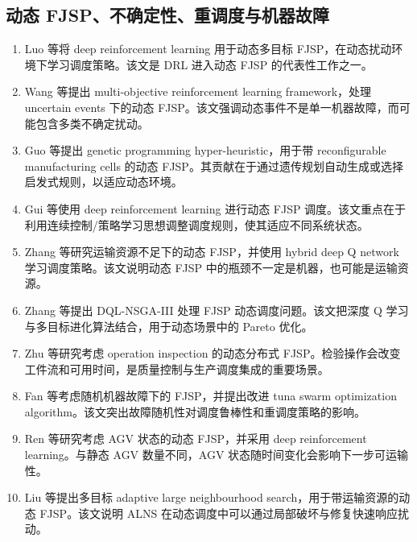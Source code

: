 \documentclass[UTF8,a4paper,11pt]{ctexart}
\begin{document}
\subsection{动态 FJSP、不确定性、重调度与机器故障}

\begin{enumerate}[label=\textbf{D\arabic*.},leftmargin=3em]
\item Luo 等将 deep reinforcement learning 用于动态多目标 FJSP，在动态扰动环境下学习调度策略\cite{Luo2021DRL}。该文是 DRL 进入动态 FJSP 的代表性工作之一。

\item Wang 等提出 multi-objective reinforcement learning framework，处理 uncertain events 下的动态 FJSP\cite{Wang2022MORL}。该文强调动态事件不是单一机器故障，而可能包含多类不确定扰动。

\item Guo 等提出 genetic programming hyper-heuristic，用于带 reconfigurable manufacturing cells 的动态 FJSP\cite{Guo2023GP}。其贡献在于通过遗传规划自动生成或选择启发式规则，以适应动态环境。

\item Gui 等使用 deep reinforcement learning 进行动态 FJSP 调度\cite{Gui2023DDPG}。该文重点在于利用连续控制/策略学习思想调整调度规则，使其适应不同系统状态。

\item Zhang 等研究运输资源不足下的动态 FJSP，并使用 hybrid deep Q network 学习调度策略\cite{Zhang2023InsufficientTR}。该文说明动态 FJSP 中的瓶颈不一定是机器，也可能是运输资源。

\item Zhang 等提出 DQL-NSGA-III 处理 FJSP 动态调度问题\cite{Zhang2023DQLNSGAIII}。该文把深度 Q 学习与多目标进化算法结合，用于动态场景中的 Pareto 优化。

\item Zhu 等研究考虑 operation inspection 的动态分布式 FJSP\cite{Zhu2023Inspection}。检验操作会改变工件流和可用时间，是质量控制与生产调度集成的重要场景。

\item Fan 等考虑随机机器故障下的 FJSP，并提出改进 tuna swarm optimization algorithm\cite{Fan2024Breakdown}。该文突出故障随机性对调度鲁棒性和重调度策略的影响。

\item Ren 等研究考虑 AGV 状态的动态 FJSP，并采用 deep reinforcement learning\cite{Ren2024AGVStates}。与静态 AGV 数量不同，AGV 状态随时间变化会影响下一步可运输性。

\item Liu 等提出多目标 adaptive large neighbourhood search，用于带运输资源的动态 FJSP\cite{Liu2024ALNS}。该文说明 ALNS 在动态调度中可以通过局部破坏与修复快速响应扰动。


\end{enumerate}
\end{document}
